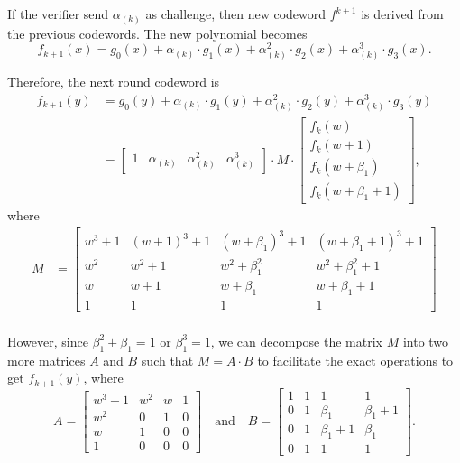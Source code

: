 \documentclass[11pt,runningheads]{llncs}
\begin{document}
If the verifier send $\alpha_{(k)}$ as challenge, then new codeword $f^{k+1}$ is derived from the previous codewords. The new polynomial becomes
\[f_{k+1}(x)=g_{0}(x)+\alpha_{(k)}\cdot g_{1}(x)+ \alpha_{(k)}^2 \cdot g_{2}(x)+ \alpha_{(k)}^3 \cdot g_{3}(x). \]

Therefore, the next round codeword is
\begin{equation*}
    \begin{aligned}
        f_{k+1}(y)
        &= g_{0}(y)+\alpha_{(k)}\cdot g_{1}(y)+ \alpha_{(k)}^2 \cdot g_{2}(y)+ \alpha_{(k)}^3 \cdot g_{3}(y)\\
        &= 
        \begin{bmatrix}
            1 & \alpha_{(k)} & \alpha_{(k)}^2 & \alpha_{(k)}^3
        \end{bmatrix}
        \cdot M \cdot
        \begin{bmatrix}
            f_k(w)\\
            f_k(w+1)\\
            f_k(w+\beta_1)\\
            f_k(w+\beta_1+1)
        \end{bmatrix},
    \end{aligned}
\end{equation*}
where
\begin{equation*}
    \begin{aligned}
        M &= 
        \begin{bmatrix}
            w^3+1 & (w+1)^3+1 & (w+\beta_1)^3+1 & (w+\beta_1+1)^3+1 \\
            w^2 & w^2+1 & w^2+\beta_1^2 & w^2+\beta_1^2+1 \\
            w & w+1 & w+\beta_1 & w+\beta_1+1 \\
            1 & 1 & 1 & 1
        \end{bmatrix}\\
    \end{aligned}
\end{equation*}

However, since $\beta_1^2+\beta_1=1$ or $\beta_1^3=1$, we can decompose the matrix $M$ into two more matrices $A$ and $B$ such that $M=A\cdot B$ to facilitate the exact operations to get $f_{k+1}(y)$, where
\[ 
A=
\begin{bmatrix} w^3+1 & w^2 & w & 1 \\ w^2 & 0 & 1 & 0 \\ w & 1 & 0 & 0 \\ 1 & 0 & 0 & 0 \end{bmatrix}
\quad \text{and} \quad
B=
\begin{bmatrix}
1 & 1 & 1 & 1 \\
0 & 1 & \beta_1 & \beta_1+1 \\
0 & 1 & \beta_1+1 & \beta_1 \\
0 & 1 & 1 & 1
\end{bmatrix}.
\]
\end{document}

